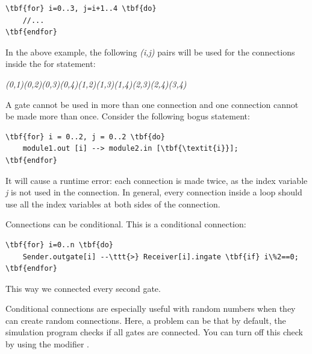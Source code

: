 \begin{Verbatim}[commandchars=\\\{\}]
\tbf{for} i=0..3, j=i+1..4 \tbf{do}
    //...
\tbf{endfor}
\end{Verbatim}


In the above example, the following \textit{(i,j)} pairs will be used 
for the connections inside the for statement:

\tab \textit{(0,1)\tab (0,2)\tab (0,3)\tab (0,4)\tab (1,2)\tab (1,3)\tab (1,4)\tab (2,3)\tab (2,4)\tab (3,4)}

A gate cannot be used in more than one connection and one connection 
cannot be made more than once. Consider the following bogus statement:


\begin{Verbatim}[commandchars=\\\{\}]
\tbf{for} i = 0..2, j = 0..2 \tbf{do}
    module1.out [i] --> module2.in [\tbf{\textit{i}}];
\tbf{endfor}
\end{Verbatim}


It will cause a runtime error: each connection is made twice, 
as the index variable \textit{j} is not used in the connection. In 
general, every connection inside a loop should use all the index 
variables at both sides of the connection.




Connections can be conditional. This is a conditional connection:


\begin{Verbatim}[commandchars=\\\{\}]
\tbf{for} i=0..n \tbf{do}
    Sender.outgate[i] --\ttt{>} Receiver[i].ingate \tbf{if} i\%2==0;
\tbf{endfor}
\end{Verbatim}


This way we connected every second gate.





Conditional connections are especially useful with random numbers when
they can create random connections. Here, a
problem can be that by default, the simulation program checks if all
gates are connected. You can turn off this check by using the
 modifier
.

